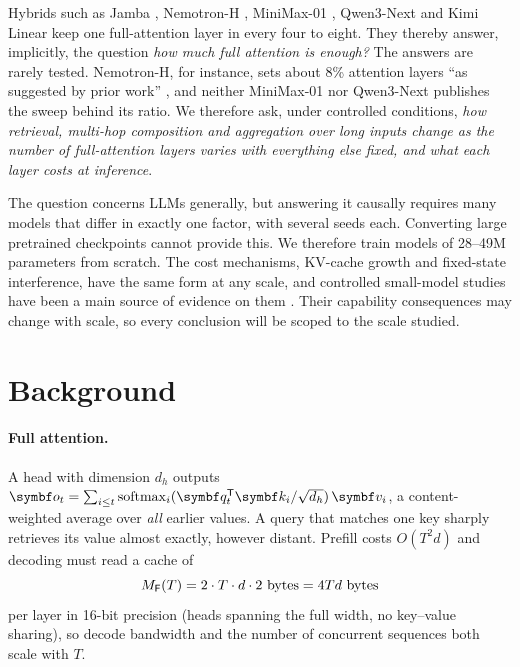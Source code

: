 \documentclass[10pt,a4paper]{article}
\begin{document}
Hybrids such as Jamba \citep{lieber2024jamba}, Nemotron-H \citep{nvidia2025nemotronh}, MiniMax-01
\citep{minimax2025minimax01}, Qwen3-Next \citep{qwen2025qwen3next} and Kimi Linear \citep{kimi2025linear}
keep one full-attention layer in every four to eight. They thereby answer, implicitly, the question \emph{how
much full attention is enough?} The answers are rarely tested. Nemotron-H, for instance, sets about
8\% attention layers ``as suggested by prior work'' \citep{waleffe2024empirical}, and neither MiniMax-01 nor
Qwen3-Next publishes the sweep behind its ratio. We therefore ask, under controlled conditions,
\emph{how retrieval, multi-hop composition and aggregation over long inputs change as the number of
full-attention layers varies with everything else fixed, and what each layer costs at inference}.

The question concerns LLMs generally, but answering it causally requires many models that differ in
exactly one factor, with several seeds each. Converting large pretrained checkpoints cannot provide this.
We therefore train models of 28--49M parameters from scratch. The cost mechanisms, KV-cache growth and
fixed-state interference, have the same form at any scale, and controlled small-model studies have been a
main source of evidence on them \citep{arora2023zoology,waleffe2024empirical}. Their capability consequences
may change with scale, so every conclusion will be scoped to the scale studied.

\section{Background}
\paragraph{Full attention.} A head with dimension $d_h$ outputs
$\vect{o}_t=\sum_{i\le t}\softmax_i(\vect{q}_t^{\T}\vect{k}_i/\sqrt{d_h})\,\vect{v}_i$, a content-weighted
average over \emph{all} earlier values. A query that matches one key sharply retrieves its value almost
exactly, however distant. Prefill costs $O(T^2d)$ and decoding must read a cache of
\begin{equation}\label{eq:kv}
  M_{\Full}(T)=2\cdot T\cdot d\cdot 2\ \text{bytes}=4Td\ \text{bytes}
\end{equation}
per layer in 16-bit precision (heads spanning the full width, no key--value sharing), so decode bandwidth and the number of concurrent sequences both scale with $T$.
\end{document}
